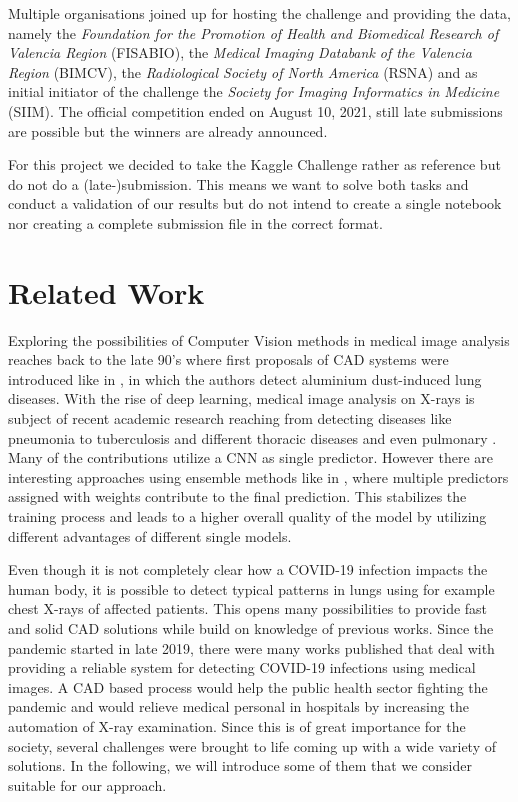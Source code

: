 Multiple organisations joined up for hosting the challenge and providing the data, namely the \textit{Foundation for the Promotion of Health and Biomedical Research of Valencia Region} (FISABIO), the \textit{Medical Imaging Databank of the Valencia Region} (BIMCV), the \textit{Radiological Society of North America} (RSNA) and as initial initiator of the challenge the \textit{Society for Imaging Informatics in Medicine} (SIIM). The official competition ended on August 10, 2021, still late submissions are possible but the winners are already announced.

For this project we decided to take the Kaggle Challenge rather as reference but do not do a (late-)submission. This means we want to solve both tasks and conduct a validation of our results but do not intend to create a single notebook nor creating a complete submission file in the correct format. 


\section{Related Work}
Exploring the possibilities of Computer Vision methods in medical image analysis reaches back to the late 90's where first proposals of \ac{CAD} systems were  introduced like in \autocite{kraus2000aluminium}, in which the authors detect aluminium dust-induced lung diseases.
With the rise of deep learning, medical image analysis on X-rays is subject of recent academic research reaching from detecting diseases like pneumonia \autocite{pneumoniaDetection} \autocite{pneumoniaDetection2} \autocite{gupta2019evolutionary} to tuberculosis and different thoracic diseases \autocite{jangam2021deep} and even pulmonary \autocite{vieira2021detecting}. Many of the contributions utilize a \ac{CNN} as single predictor. However there are interesting approaches using ensemble methods like in \autocite{livieris2019weighted}, where multiple predictors assigned with weights contribute to the final prediction. This stabilizes the training process and leads to a higher overall quality of the model by utilizing different advantages of different single models.

Even though it is not completely clear how a COVID-19 infection impacts the human body, it is possible to detect typical patterns in lungs using for example chest X-rays of affected patients. This opens many possibilities to provide fast and solid \ac{CAD} solutions while build on knowledge of previous works.
Since the pandemic started in late 2019, there were many works published that deal with providing a reliable system for detecting COVID-19 infections using medical images. A \ac{CAD} based process would help the public health sector fighting the pandemic and would relieve medical personal in hospitals by increasing the automation of X-ray examination. Since this is of great importance for the society, several challenges were brought to life coming up with a wide variety of solutions. In the following, we will introduce some of them that we consider suitable for our approach.

